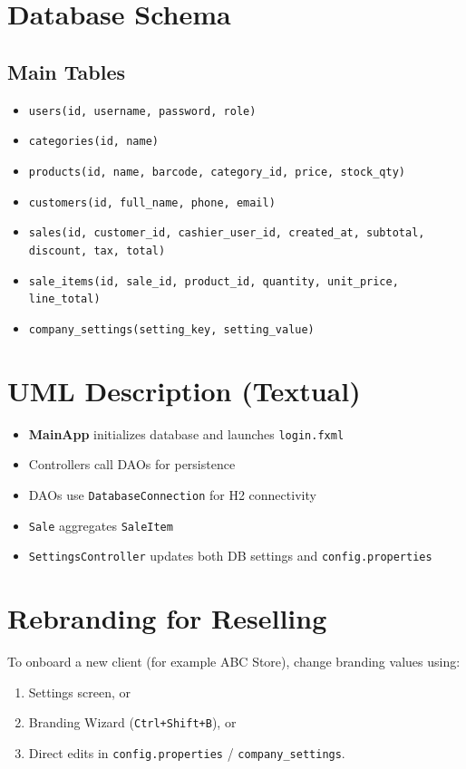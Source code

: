 \documentclass[12pt]{article}
\begin{document}
\section{Database Schema}
\subsection{Main Tables}
\begin{itemize}[leftmargin=*]
    \item \texttt{users(id, username, password, role)}
    \item \texttt{categories(id, name)}
    \item \texttt{products(id, name, barcode, category\_id, price, stock\_qty)}
    \item \texttt{customers(id, full\_name, phone, email)}
    \item \texttt{sales(id, customer\_id, cashier\_user\_id, created\_at, subtotal, discount, tax, total)}
    \item \texttt{sale\_items(id, sale\_id, product\_id, quantity, unit\_price, line\_total)}
    \item \texttt{company\_settings(setting\_key, setting\_value)}
\end{itemize}

\section{UML Description (Textual)}
\begin{itemize}[leftmargin=*]
    \item \textbf{MainApp} initializes database and launches \texttt{login.fxml}
    \item Controllers call DAOs for persistence
    \item DAOs use \texttt{DatabaseConnection} for H2 connectivity
    \item \texttt{Sale} aggregates \texttt{SaleItem}
    \item \texttt{SettingsController} updates both DB settings and \texttt{config.properties}
\end{itemize}

\section{Rebranding for Reselling}
To onboard a new client (for example ABC Store), change branding values using:
\begin{enumerate}[leftmargin=*]
    \item Settings screen, or
    \item Branding Wizard (\texttt{Ctrl+Shift+B}), or
    \item Direct edits in \texttt{config.properties} / \texttt{company\_settings}.
\end{enumerate}
\end{document}
